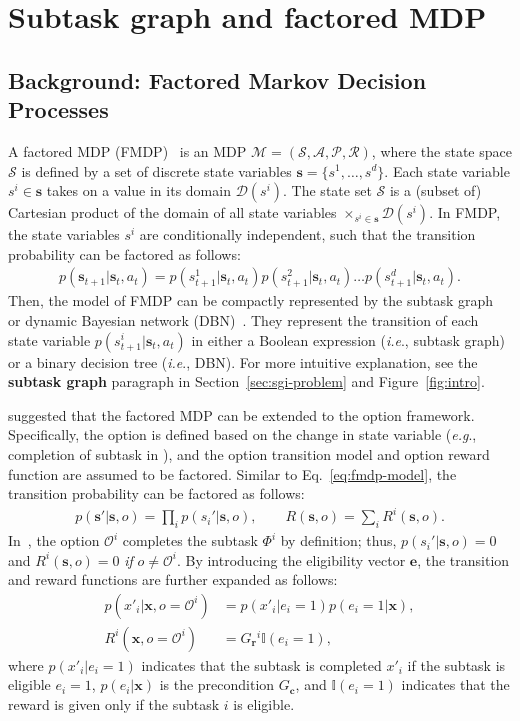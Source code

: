 \documentclass{article} \usepackage{iclr2020_conference,times}
\makeatletter
\newcommand{\GC}{ G_{\mb{c}} }
\newcommand{\GR}{ G_{\mb{r}} }
\newcommand{\mb}{\mathbf}
\newcommand{\tb}{\textbf}
\newcommand{\mbb}{\mathbb}
\newcommand{\mc}{\mathcal}
\DeclareRobustCommand\onedot{\futurelet\@let@token\@onedot}
\def\onedot{.}
\def\eg{\emph{e.g}\onedot} \def\Eg{\emph{E.g}\onedot}
\def\ie{\emph{i.e}\onedot} \def\Ie{\emph{I.e}\onedot}
\newcommand{\cutsubsectiondown}{\vspace*{-0.05in}}
\makeatother
\begin{document}
\medskip
\section{Subtask graph and factored MDP}
\label{sec:appendix_task}


\subsection{Background: Factored Markov Decision Processes}\label{sec:FMDP}
\cutsubsectiondown
A factored MDP (FMDP)~\citep{boutilier1995exploiting,jonsson2006causal} is an MDP $\mc{M}=(\mc{S, A, P, R})$,
where the state space $\mc{S}$ is defined by a set of discrete state variables $\mb{s} = \{s^1, \ldots, s^d\}$.
Each state variable $s^i\in\mb{s}$ takes on a value in its domain $\mc{D}(s^i)$.
The state set $\mc{S}$ is a (subset of) Cartesian product of the domain of all state variables $\times_{s^i\in\mb{s}}\mc{D}(s^i)$. 
In FMDP, the state variables $s^i$ are conditionally independent, such that the transition probability can be factored as follows:
\begin{align}
p(\mb{s}_{t+1} | \mb{s}_{t}, a_t) = p(s^1_{t+1} | \mb{s}_{t}, a_t)p(s^2_{t+1} | \mb{s}_{t}, a_t)\ldots p(s^d_{t+1} | \mb{s}_{t}, a_t).\label{eq:fmdp-model}
\end{align}
Then, the model of FMDP can be compactly represented by the subtask graph~\citep{sohn2018hierarchical} or dynamic Bayesian network (DBN)~\citep{dean1989model, boutilier1995exploiting}. 
They represent the transition of each state variable $p(s^i_{t+1}|\mb{s}_t, a_t)$ in either a Boolean expression (\ie, subtask graph) or a binary decision tree (\ie, DBN). For more intuitive explanation, see the \tb{subtask graph} paragraph in Section~\ref{sec:sgi-problem} and Figure~\ref{fig:intro}.

\cite{jonsson2006causal, sohn2018hierarchical} suggested that the factored MDP can be extended to the option framework. Specifically, the option is defined based on the change in state variable (\eg, completion of subtask in \cite{sohn2018hierarchical}), and the option transition model and option reward function are assumed to be factored.
Similar to Eq.~\ref{eq:fmdp-model}, the transition probability can be factored as follows:
\begin{align}
    p(\mb{s}' | \mb{s}, o) = \prod_i p(s_i' | \mb{s}, o),\qquad R(\mb{s}, o) = \sum_i R^i(\mb{s}, o).
\end{align}
In~\citep{sohn2018hierarchical}, the option $\mc{O}^i$ completes the subtask $\Phi^i$ by definition; thus, $p(s_i' | \mb{s}, o)=0$ and $R^i(\mb{s}, o)=0$ \emph{if} $o\neq\mc{O}^i$. By introducing the eligibility vector $\mb{e}$, the transition and reward functions are further expanded as follows:
\begin{align}
    p(x'_i|\mb{x}, o=\mc{O}^i)&=p(x'_i|e_i=1)p(e_i=1|\mb{x}),\\
    R^i(\mb{x}, o=\mc{O}^i)&=\GR{}^i \mbb{I}(e_i=1),
\end{align}
where $p(x'_i|e_i=1)$ indicates that the subtask is completed $x'_i$ if the subtask is eligible $e_i=1$, $p(e_i|\mb{x})$ is the precondition $\GC{}$, and $\mbb{I}(e_i=1)$ indicates that the reward is given only if the subtask $i$ is eligible.
\end{document}
